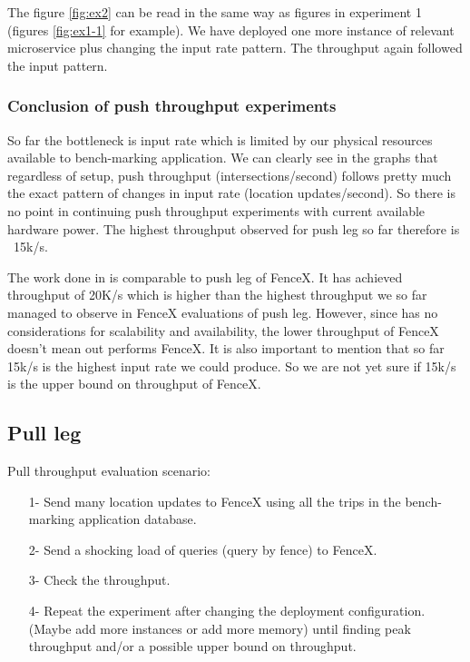\documentclass[a4]{report}
\begin{document}
    \clearpage

    The figure \ref{fig:ex2} can be read in the same way as figures in experiment 1 (figures \ref{fig:ex1-1} for
    example).
    We have deployed one more instance of relevant microservice plus changing the input rate pattern.
    The throughput again followed the input pattern.

    \subsubsection{Conclusion of push throughput experiments}
    So far the bottleneck is input rate which is limited by our physical resources available to bench-marking
    application.
    We can clearly see in the graphs that regardless of setup, push throughput (intersections/second) follows pretty
    much the exact pattern of changes in input rate (location updates/second).
    So there is no point in continuing push throughput experiments with current available hardware power.
    The highest throughput observed for push leg so far therefore is ~15k/s.

    The work done in \cite{Nechifor_Comnac_2013} is comparable to push leg of FenceX.
    It has achieved throughput of 20K/s which is higher than the highest throughput we so far managed to observe in
    FenceX evaluations of push leg.
    However, since \cite{Nechifor_Comnac_2013} has no considerations for scalability and availability, the lower
    throughput of FenceX doesn't mean \cite{Nechifor_Comnac_2013} out performs FenceX.
    It is also important to mention that so far 15k/s is the highest input rate we could produce.
    So we are not yet sure if 15k/s is the upper bound on throughput of FenceX.

    \subsection{Pull leg}
    Pull throughput evaluation scenario:
    \begin{itemize}
        \item[1-] Send many location updates to FenceX using all the trips in the bench-marking application database.
        \item[2-] Send a shocking load of queries (query by fence) to FenceX.
        \item[3-] Check the throughput.
        \item[4-] Repeat the experiment after changing the deployment configuration. (Maybe add more instances or add
        more memory) until finding peak throughput and/or a possible upper bound on throughput.
    \end{itemize}
\end{document}
